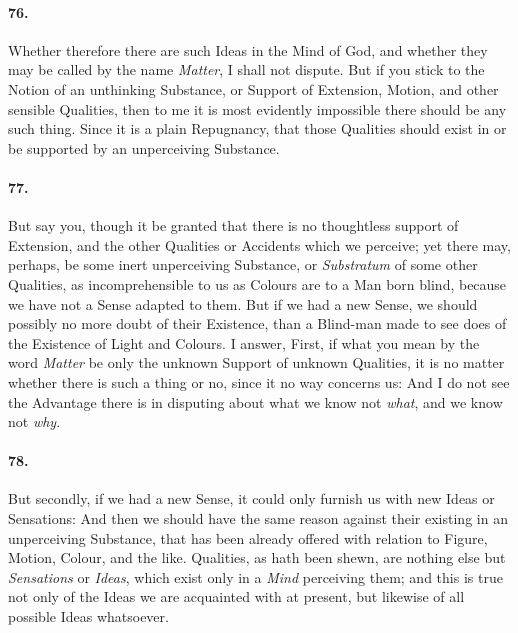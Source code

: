 \documentclass[]{article}
\newenvironment{sectionbody}{}{}
\begin{document}
\begin{sectionbody}
\paragraph{76.} Whether therefore there are such Ideas in the Mind of {\sc God}, and
whether they may be called by the name \emph{Matter}, I shall
not dispute.  But if you stick to the Notion of an unthinking
Substance, or Support of Extension, Motion, and other sensible
Qualities, then to me it is most evidently impossible there
should be any such thing.  Since it is a plain Repugnancy, that
those Qualities should exist in or be supported by an
unperceiving Substance.



\paragraph{77.} But say you, though it be granted that there is no thoughtless
support of Extension, and the other Qualities or Accidents which
we perceive; yet there may, perhaps, be some inert unperceiving
Substance, or \emph{Substratum} of some other Qualities, as
incomprehensible to us as Colours are to a Man born blind,
because we have not a Sense adapted to them.  But if we had a new
Sense, we should possibly no more doubt of their Existence, than
a Blind-man made to see does of the Existence of Light and
Colours.  I answer, First, if what you mean by the word
\emph{Matter} be only the unknown Support of unknown Qualities,
it is no matter whether there is such a thing or no, since it no
way concerns us: And I do not see the Advantage there is in
disputing about what we know not \emph{what}, and we know not
\emph{why}.



\paragraph{78.} But secondly, if we had a new Sense, it could only furnish us
with new Ideas or Sensations: And then we should have the same
reason against their existing in an unperceiving Substance, that
has been already offered with relation to Figure, Motion, Colour,
and the like.  Qualities, as hath been shewn, are nothing else
but \emph{Sensations} or \emph{Ideas}, which exist only in a
\emph{Mind} perceiving them; and this is true not only of the
Ideas we are acquainted with at present, but likewise of all
possible Ideas whatsoever.




\end{sectionbody}
\end{document}
